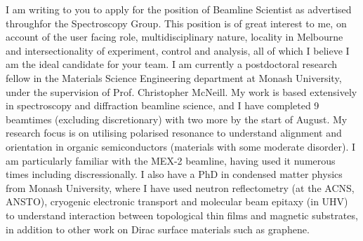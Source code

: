 \documentclass[10pt,a4paper,ragged2e,withhyper,paragraphstrue]{altacv}
\newcommand{\pind}{\hspace{24pt}}
\begin{document}
	\pind I am writing to you to apply for the position of Beamline Scientist as advertised throughfor the Spectroscopy Group. This position is of great interest to me, on account of the user facing role, multidisciplinary nature, locality in Melbourne and intersectionality of experiment, control and analysis, all of which I believe I am the ideal candidate for your team. 
    \pind I am currently a postdoctoral research fellow in the Materials Science Engineering department at Monash University, under the supervision of Prof. Christopher McNeill. My work is based extensively in spectroscopy and diffraction beamline science, and I have completed 9 beamtimes (excluding discretionary) with two more by the start of August. My research focus is on utilising polarised resonance to understand alignment and orientation in organic semiconductors (materials with some moderate disorder). I am particularly familiar with the MEX-2 beamline, having used it numerous times including discressionally.
    I also have a PhD in condensed matter physics from Monash University, where I have used neutron reflectometry (at the ACNS, ANSTO), cryogenic electronic transport and molecular beam epitaxy (in UHV) to understand interaction between topological thin films and magnetic substrates, in addition to other work on Dirac surface materials such as graphene.

\end{document}
